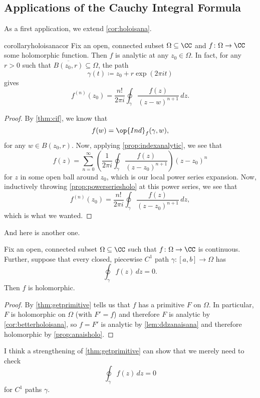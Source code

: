 \documentclass[../notes.tex]{subfiles}
\begin{document}
\subsection{Applications of the Cauchy Integral Formula}
As a first application, we extend \autoref{cor:holoisana}.
\begin{restatable}{corollary}{holoisanacor} \label{cor:betterholoisana}
	Fix an open, connected subset $\Omega\subseteq\CC$ and $f\colon \Omega\to\CC$ some holomorphic function. Then $f$ is analytic at any $z_0\in\Omega$. In fact, for any $r>0$ such that $\overline{B(z_0,r)}\subseteq\Omega$, the path
	\[\gamma(t)\coloneqq z_0+r\exp(2\pi it)\]
	gives
	\[f^{(n)}(z_0)=\frac{n!}{2\pi i}\oint_\gamma\frac{f(z)}{(z-w)^{n+1}}\,dz.\]
\end{restatable}
\begin{proof}
	By \autoref{thm:cif}, we know that
	\[f(w)=\op{Ind}_f(\gamma,w),\]
	for any $w\in B(z_0,r)$. Now, applying \autoref{prop:indexanalytic}, we see that 
	\[f(z)=\sum_{n=0}^\infty\left(\frac1{2\pi i}\oint_\gamma\frac{f(z)}{(z-z_0)^{n+1}}\right)(z-z_0)^n\]
	for $z$ in some open ball around $z_0$, which is our local power series expansion. Now, inductively throwing \autoref{prop:powerseriesholo} at this power series, we see that
	\[f^{(n)}(z_0)=\frac{n!}{2\pi i}\oint_\gamma\frac{f(z)}{(z-z_0)^{n+1}}\,dz,\]
	which is what we wanted.
\end{proof}
And here is another one.
\begin{theorem}[Morera] \label{thm:morera}
	Fix an open, connected subset $\Omega\subseteq\CC$ such that $f\colon \Omega\to\CC$ is continuous. Further, suppose that every closed, piecewise $C^1$ path $\gamma\colon [a,b]\to\Omega$ has
	\[\oint_\gamma f(z)\,dz=0.\]
	Then $f$ is holomorphic.
\end{theorem}
\begin{proof}
	By \autoref{thm:getprimitive} tells us that $f$ has a primitive $F$ on $\Omega$. In particular, $F$ is holomorphic on $\Omega$ (with $F'=f$) and therefore $F$ is analytic by \autoref{cor:betterholoisana}, so $f=F'$ is analytic by \autoref{lem:ddzanaisana} and therefore holomorphic by \autoref{prop:anaisholo}.
\end{proof}
\begin{remark}
	I think a strengthening of \autoref{thm:getprimitive} can show that we merely need to check
	\[\oint_\gamma f(z)\,dz=0\]
	for $C^1$ paths $\gamma$.
\end{remark}
\end{document}
